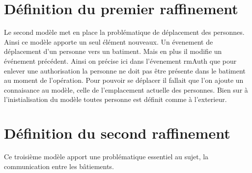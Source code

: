 \documentclass[12pt,a4paper]{article}
\begin{document}

\section{Définition du premier raffinement}
Le second modèle met en place la problématique de déplacement des personnes. Ainsi ce modèle apporte un seul élément nouveaux. Un évenement de déplacement d'un personne vers un batiment. Mais en plus il modifie un événement précédent. Ainsi on précise ici dans l'évenement rmAuth 
que pour enlever une authorisation la personne ne doit pas être présente dans le batiment au moment de l'opération.
Pour pouvoir se déplacer il fallait que l'on ajoute un connaisance au modèle, celle de l'emplacement actuelle des personnes. Bien sur à l'inistialisation du modèle toutes personne est définit comme à l'exterieur.

\section{Définition du second raffinement}
Ce troisième modèle apport une problématique essentiel au sujet, la communication entre les bâtiements.


\tableofcontents
\end{document}
